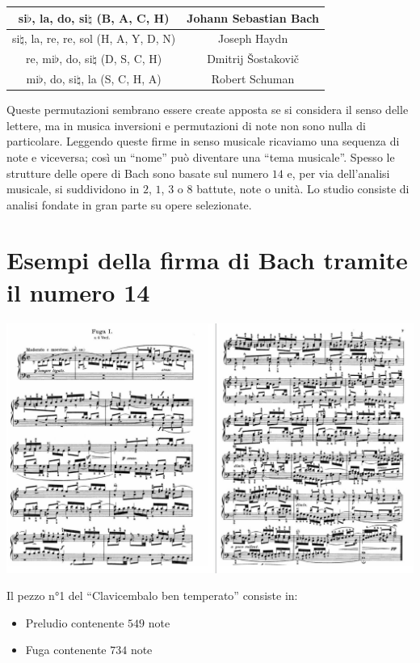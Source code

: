 \documentclass[12pt]{article}
\begin{document}
\begin{center}
\begin{tabular}{|c|c|} 

  \hline
  si$\flat$, la, do, si$\natural$ (B, A, C, H)  & Johann Sebastian Bach \\
  \hline
  si$\natural$, la, re, re, sol (H, A, Y, D, N)  & Joseph Haydn \\ 
  \hline
  re, mi$\flat$, do, si$\natural$ (D, S, C, H) & Dmitrij Šostakovič \\
  \hline
  mi$\flat$, do, si$\natural$, la (S, C, H, A)  & Robert Schuman \\
  \hline

\end{tabular}
\end{center}
Queste permutazioni sembrano essere create apposta se si considera il senso delle lettere, ma in
musica inversioni e permutazioni di note non sono nulla di particolare.
Leggendo queste firme in senso musicale ricaviamo una sequenza di note e viceversa; così un
“nome” può diventare una “tema musicale”.
Spesso le strutture delle opere di Bach sono basate sul numero $14$ e, per via dell’analisi musicale,
si suddividono in $2$, $1$, $3$ o $8$ battute, note o unità.
Lo studio consiste di analisi fondate in gran parte su opere selezionate.

\section{Esempi della firma di Bach tramite il numero 14}

\includegraphics[scale=0.32]{media/esempio_firma.png}

Il pezzo n°1 del “Clavicembalo ben temperato” consiste in:
\begin{itemize}
    \item Preludio contenente $549$ note
    \item Fuga contenente $734$ note
\end{itemize}
\end{document}
